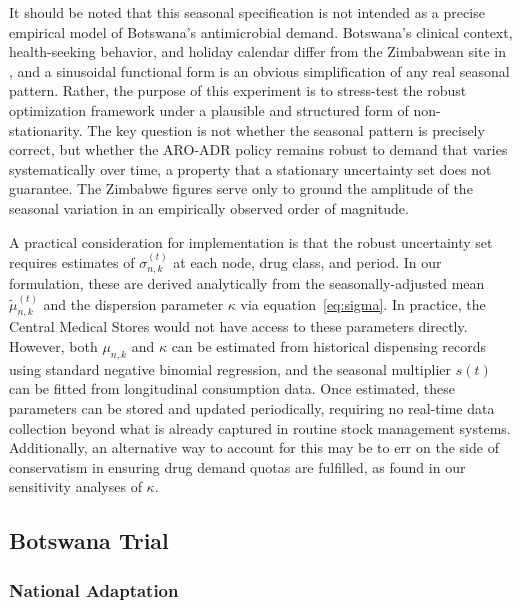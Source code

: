 \documentclass{article}
\begin{document}
It should be noted that this seasonal specification is not intended as a precise empirical model of Botswana's antimicrobial demand. Botswana's clinical context, health-seeking behavior, and holiday calendar differ from the Zimbabwean site in \cite{ballif2018}, and a sinusoidal functional form is an obvious simplification of any real seasonal pattern. Rather, the purpose of this experiment is to stress-test the robust optimization framework under a plausible and structured form of non-stationarity. The key question is not whether the seasonal pattern is precisely correct, but whether the ARO-ADR policy remains robust to demand that varies systematically over time, a property that a stationary uncertainty set does not guarantee. The Zimbabwe figures serve only to ground the amplitude of the seasonal variation in an empirically observed order of magnitude.

A practical consideration for implementation is that the robust uncertainty set requires estimates of $\sigma_{n,k}^{(t)}$ at each node, drug class, and period. In our formulation, these are derived analytically from the seasonally-adjusted mean $\tilde{\mu}_{n,k}^{(t)}$ and the dispersion parameter $\kappa$ via equation~\eqref{eq:sigma}. In practice, the Central Medical Stores would not have access to these parameters directly. However, both $\mu_{n,k}$ and $\kappa$ can be estimated from historical dispensing records using standard negative binomial regression, and the seasonal multiplier $s(t)$ can be fitted from longitudinal consumption data. Once estimated, these parameters can be stored and updated periodically, requiring no real-time data collection beyond what is already captured in routine stock management systems. Additionally, an alternative way to account for this may be to err on the side of conservatism in ensuring drug demand quotas are fulfilled, as found in our sensitivity analyses of $\kappa$.

\subsection{Botswana Trial}
\subsubsection{National Adaptation}
\label{botswananatadap}
\end{document}
